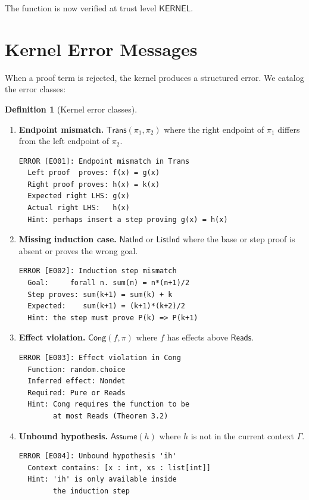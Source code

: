 \documentclass[11pt,a4paper]{report}
\theoremstyle{definition}
\newtheorem{definition}{Definition}[chapter]
\theoremstyle{plain}
\newcommand{\Assume}{\mathsf{Assume}}
\newcommand{\Trans}{\mathsf{Trans}}
\newcommand{\Cong}{\mathsf{Cong}}
\newcommand{\Reads}{\mathsf{Reads}}
\begin{document}
\noindent
The function is now verified at trust level $\mathsf{KERNEL}$.


\section{Kernel Error Messages}
\label{sec:error-messages}

When a proof term is rejected, the kernel produces a structured error.
We catalog the error classes:

\begin{definition}[Kernel error classes]
\label{def:kernel-errors}
\leavevmode
\begin{enumerate}
  \item \textbf{Endpoint mismatch.}
    $\Trans(\pi_1, \pi_2)$ where the right endpoint of $\pi_1$ differs
    from the left endpoint of $\pi_2$.
\begin{lstlisting}[style=proof]
ERROR [E001]: Endpoint mismatch in Trans
  Left proof  proves: f(x) = g(x)
  Right proof proves: h(x) = k(x)
  Expected right LHS: g(x)
  Actual right LHS:   h(x)
  Hint: perhaps insert a step proving g(x) = h(x)
\end{lstlisting}

  \item \textbf{Missing induction case.}
    $\mathsf{NatInd}$ or $\mathsf{ListInd}$ where the base or step
    proof is absent or proves the wrong goal.
\begin{lstlisting}[style=proof]
ERROR [E002]: Induction step mismatch
  Goal:     forall n. sum(n) = n*(n+1)/2
  Step proves: sum(k+1) = sum(k) + k
  Expected:    sum(k+1) = (k+1)*(k+2)/2
  Hint: the step must prove P(k) => P(k+1)
\end{lstlisting}

  \item \textbf{Effect violation.}
    $\Cong(f, \pi)$ where $f$ has effects above $\Reads$.
\begin{lstlisting}[style=proof]
ERROR [E003]: Effect violation in Cong
  Function: random.choice
  Inferred effect: Nondet
  Required: Pure or Reads
  Hint: Cong requires the function to be
        at most Reads (Theorem 3.2)
\end{lstlisting}

  \item \textbf{Unbound hypothesis.}
    $\Assume(h)$ where $h$ is not in the current context $\Gamma$.
\begin{lstlisting}[style=proof]
ERROR [E004]: Unbound hypothesis 'ih'
  Context contains: [x : int, xs : list[int]]
  Hint: 'ih' is only available inside
        the induction step
\end{lstlisting}


\end{enumerate}
\end{definition}
\end{document}

